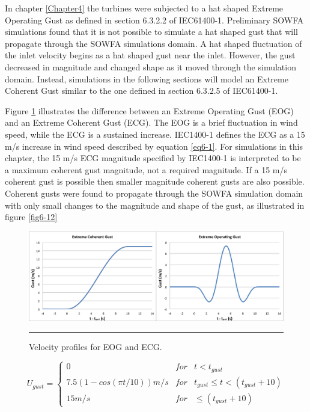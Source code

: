 In chapter \ref{Chapter4} the turbines were subjected to a hat shaped Extreme Operating Gust as defined in section 6.3.2.2 of IEC61400-1\cite{IEC2005}. Preliminary SOWFA simulations found that it is not possible to simulate a hat shaped gust that will propagate through the SOWFA simulations domain. A hat shaped fluctuation of the inlet velocity begins as a hat shaped gust near the inlet. However, the gust decreased in magnitude and changed shape as it moved through the simulation domain. Instead, simulations in the following sections will model an Extreme Coherent Gust similar to the one defined in section 6.3.2.5 of IEC61400-1. 

Figure \ref{fig6-11} illustrates the difference between an Extreme Operating Gust (EOG) and an Extreme Coherent Gust (ECG). The EOG is a brief fluctuation in wind speed, while the ECG is a sustained increase. IEC1400-1 defines the ECG as a 15 m/s increase in wind speed described by equation \ref{eq6-1}. For simulations in this chapter, the 15 m/s ECG magnitude specified by IEC1400-1 is interpreted to be a maximum coherent gust magnitude, not a required magnitude. If a 15 m/s coherent gust is possible then smaller magnitude coherent gusts are also possible. Coherent gusts were found to propagate through the SOWFA simulation domain with only small changes to the magnitude and shape of the gust, as illustrated in figure \ref{fig6-12}



\begin{figure}[htbp] \label{fig6-11} 
	\centering
		\includegraphics[trim = {1cm 0 2cm 0}, clip, width = \linewidth]{Figures/ch6Figures/fig6-11.png}
		\rule{35em}{0.5pt}
	\caption{Velocity profiles for EOG and ECG.}
\end{figure}

\begin{equation} \label{eq6-1}
	U_{gust}=\left\{\begin{matrix}
0 & for  & t<t_{gust}\\ 
 7.5(1-cos(\pi t/10)) m/s & for  & t_{gust} \leq t<(t_{gust}+10)\\ 
 15 m/s &  for & \leq (t_{gust} +10)
\end{matrix}\right. 
\end{equation}

